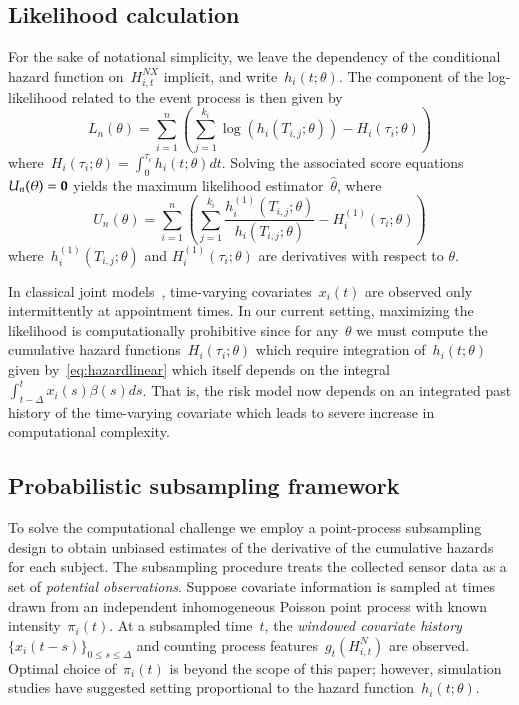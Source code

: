 \documentclass[11pt]{amsart}
\begin{document}
\subsection{Likelihood calculation}  

For the sake of notational simplicity, we leave the dependency of the
conditional hazard function on~$H_{i,t}^{NX}$ implicit, and write~$h_i
(t; \theta)$. The component of the log-likelihood related to the event
process is then given by
\[
  L_n (\theta) = \sum_{i=1}^{n} \left ( \sum_{j=1}^{k_i} 
    \log \left( h_i \left( T_{i,j}; \theta
      \right) \right) - H_{i} \left( \tau_i; \theta \right) \right) 
\]
where~$H_{i} (\tau_i ; \theta) = \int_{0}^{\tau_i} h_{i} (t; \theta)
dt$. Solving the associated score equations~$U_n (\theta) = {\bf 0}$
yields the maximum likelihood estimator~$\hat \theta$, where
\[
U_n (\theta) = \sum_{i=1}^{n} \left ( \sum_{j=1}^{k_i} \frac{h^{(1)}_i
    (T_{i,j}; \theta)}{h_i (T_{i,j}; \theta)} - H^{(1)}_{i} (\tau_i;
  \theta) \right)  
\]
where~$h_i^{(1)} (T_{i,j}; \theta)$ and $H_i^{(1)} (\tau_{i}; \theta)$
are derivatives with respect to $\theta$.

In classical joint models~\citep{Henderson2000, Tsiatis2004},
time-varying covariates~$x_i (t)$ are observed only intermittently at
appointment times. In our current setting, maximizing the likelihood
is computationally prohibitive since for any~$\theta$ we must compute
the cumulative hazard functions~$H_{i} (\tau_i; \theta)$ which require
integration of~$h_i(t;\theta)$ given by~\eqref{eq:hazardlinear} which
itself depends on the integral~$\int_{t-\Delta}^t x_i (s) \beta(s)
ds$.  That is, the risk model now depends on an integrated past
history of the time-varying covariate which leads to severe increase
in computational complexity. 

\subsection{Probabilistic subsampling framework}

To solve the computational challenge we employ a point-process
subsampling design to obtain unbiased estimates of the derivative of
the cumulative hazards for each subject. The subsampling procedure
treats the collected sensor data as a set of \emph{potential
  observations}. Suppose covariate information is sampled at times
drawn from an independent inhomogeneous Poisson point process with
known intensity~$\pi_i (t)$. At a subsampled time~$t$, the
\emph{windowed covariate history} $\{ x_i (t-s)\}_{0 \leq s \leq
  \Delta}$ and counting process features~$g_t (H_{i,t}^N)$ are
observed. Optimal choice of~$\pi_i (t)$ is beyond the scope of this
paper; however, simulation studies have suggested setting proportional
to the hazard function~$h_i (t; \theta)$. 
\end{document}
